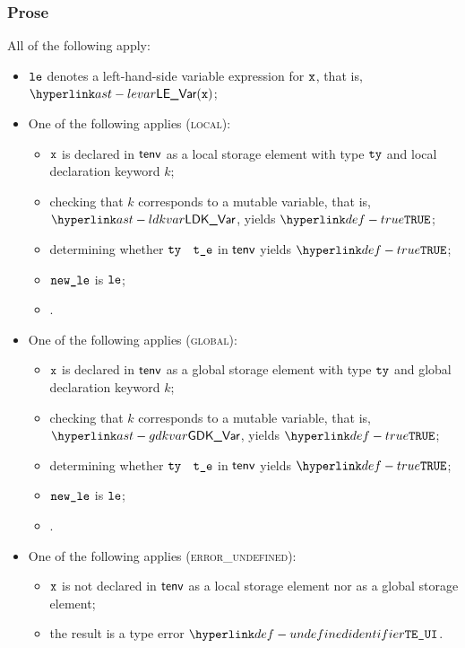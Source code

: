 \subsubsection{Prose}
All of the following apply:
\begin{itemize}
  \item $\texttt{le}$ denotes a left-hand-side variable expression for $\texttt{x}$, that is, $\LEVar(\vx)$;
  \item One of the following applies (\textsc{local}):
  \begin{itemize}
    \item $\texttt{x}$ is declared in $\textsf{tenv}$ as a local storage element with type $\texttt{ty}$ and local declaration keyword $k$;
    \item checking that $k$ corresponds to a mutable variable, that is, $\LDKVar$, yields $\True$\ProseTerminateAs{\AssignmentToImmutable};
    \item determining whether $\texttt{ty}$ \typesatisfies\ $\texttt{t\_e}$ in $\textsf{tenv}$ yields $\True$\ProseOrTypeError;
    \item $\texttt{new\_le}$ is $\texttt{le}$;
    \item {}.
  \end{itemize}

  \item One of the following applies (\textsc{global}):
  \begin{itemize}
    \item $\texttt{x}$ is declared in $\textsf{tenv}$ as a global storage element with type $\texttt{ty}$ and global declaration keyword $k$;
    \item checking that $k$ corresponds to a mutable variable, that is, $\GDKVar$, yields $\True$\ProseTerminateAs{\AssignmentToImmutable};
    \item determining whether $\texttt{ty}$ \typesatisfies\ $\texttt{t\_e}$ in $\textsf{tenv}$ yields $\True$\ProseOrTypeError;
    \item $\texttt{new\_le}$ is $\texttt{le}$;
    \item {}.
  \end{itemize}

  \item One of the following applies (\textsc{error\_undefined}):
  \begin{itemize}
    \item $\texttt{x}$ is not declared in $\textsf{tenv}$ as a local storage element nor as a global storage element;
    \item the result is a type error $\UndefinedIdentifier$.
  \end{itemize}
\end{itemize}

